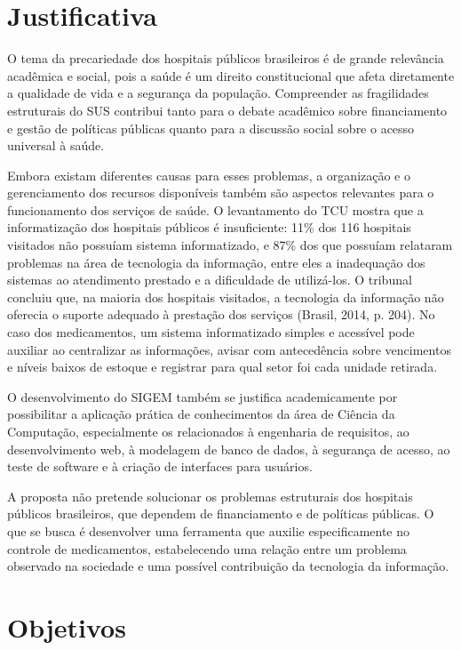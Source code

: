 \documentclass[12pt,a4paper]{article}
\begin{document}
\section{Justificativa}

O tema da precariedade dos hospitais públicos brasileiros é de grande relevância acadêmica e social, pois a saúde é um direito constitucional que afeta diretamente a qualidade de vida e a segurança da população. Compreender as fragilidades estruturais do SUS contribui tanto para o debate acadêmico sobre financiamento e gestão de políticas públicas quanto para a discussão social sobre o acesso universal à saúde.

Embora existam diferentes causas para esses problemas, a organização e o gerenciamento dos recursos disponíveis também são aspectos relevantes para o funcionamento dos serviços de saúde. O levantamento do TCU mostra que a informatização dos hospitais públicos é insuficiente: 11\% dos 116 hospitais visitados não possuíam sistema informatizado, e 87\% dos que possuíam relataram problemas na área de tecnologia da informação, entre eles a inadequação dos sistemas ao atendimento prestado e a dificuldade de utilizá-los. O tribunal concluiu que, na maioria dos hospitais visitados, a tecnologia da informação não oferecia o suporte adequado à prestação dos serviços (Brasil, 2014, p. 204). No caso dos medicamentos, um sistema informatizado simples e acessível pode auxiliar ao centralizar as informações, avisar com antecedência sobre vencimentos e níveis baixos de estoque e registrar para qual setor foi cada unidade retirada.

O desenvolvimento do SIGEM também se justifica academicamente por possibilitar a aplicação prática de conhecimentos da área de Ciência da Computação, especialmente os relacionados à engenharia de requisitos, ao desenvolvimento web, à modelagem de banco de dados, à segurança de acesso, ao teste de software e à criação de interfaces para usuários.

A proposta não pretende solucionar os problemas estruturais dos hospitais públicos brasileiros, que dependem de financiamento e de políticas públicas. O que se busca é desenvolver uma ferramenta que auxilie especificamente no controle de medicamentos, estabelecendo uma relação entre um problema observado na sociedade e uma possível contribuição da tecnologia da informação.

\section{Objetivos}
\end{document}
